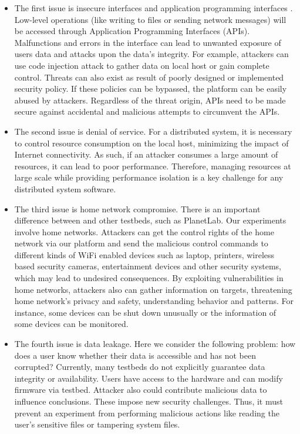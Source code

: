 \begin{itemize}
\item The first issue is insecure interfaces and application programming interfaces
. Low-level operations (like writing to files or sending network messages) 
will be accessed through Application Programming Interfaces (APIs). 
Malfunctions and errors in the interface can lead to unwanted exposure of 
users data and attacks upon the data's integrity. For example, attackers can 
use code injection attack to gather data on local host or gain complete 
control. Threats can also exist as result of poorly designed or implemented 
security policy. If these policies can be bypassed, the platform can be 
easily abused by attackers. Regardless of the threat origin, APIs need to be 
made secure against accidental and malicious attempts to circumvent the APIs.

\item The second issue is denial of service. For a distributed system, it is 
necessary to control resource consumption on the local host, minimizing the 
impact of Internet connectivity. As such, if an attacker consumes a large 
amount of resources, it can lead to poor performance. Therefore, managing 
resources at large scale while providing performance isolation is a key 
challenge for any distributed system software.

\item The third issue is home network compromise. There is an important difference between \sysname and other testbeds, such as PlanetLab. Our experiments involve home networks. Attackers can get the control rights of the home network via our platform and send the malicious control commands to different kinds of WiFi enabled devices such as laptop, printers, wireless based security cameras, entertainment devices and other security systems, which may lead to undesired consequences. By exploiting vulnerabilities in home networks, attackers also can gather information on targets, threatening home network's privacy and safety, understanding behavior and patterns. For instance, some devices can be shut down unusually or the information of some devices can be monitored.

\item The fourth issue is data leakage. Here we consider the following problem: how does a user know whether their data is accessible and has not been corrupted? Currently, many testbeds do not explicitly guarantee data integrity or availability. Users have access to the hardware and can modify firmware via testbed. Attacker also could contribute malicious data to influence conclusions. These impose new security challenges. Thus, it must prevent an experiment from performing malicious actions like reading the user's sensitive files or tampering system files.
\end{itemize}